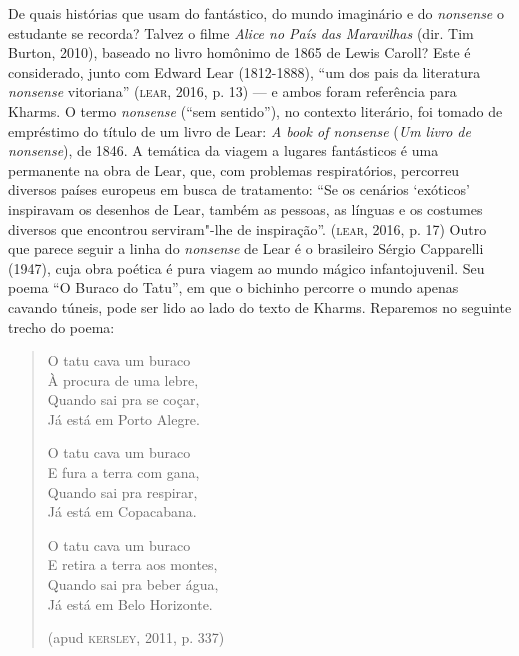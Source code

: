 \documentclass[11pt]{extarticle}
\begin{document}
De quais histórias que usam do fantástico, do mundo imaginário e do
\emph{nonsense} o estudante se recorda? Talvez o filme \emph{Alice no
País das Maravilhas} (dir. Tim Burton, 2010), baseado no livro homônimo
de 1865 de Lewis Caroll? Este é considerado, junto com Edward Lear
(1812-1888), ``um dos pais da literatura \emph{nonsense} vitoriana''
(\textsc{lear}, 2016, p. 13) --- e ambos foram referência para Kharms. O termo
\emph{nonsense} (``sem sentido''), no contexto literário, foi tomado de
empréstimo do título de um livro de Lear: \emph{A book of nonsense}
(\emph{Um livro de nonsense}), de 1846. A temática da viagem a lugares
fantásticos é uma permanente na obra de Lear, que, com problemas
respiratórios, percorreu diversos países europeus em busca de
tratamento: ``Se os cenários `exóticos' inspiravam os desenhos de Lear,
também as pessoas, as línguas e os costumes diversos que encontrou
serviram"-lhe de inspiração''. (\textsc{lear}, 2016, p. 17) Outro que parece
seguir a linha do \emph{nonsense} de Lear é o brasileiro Sérgio
Capparelli (1947), cuja obra poética é pura viagem ao mundo mágico
infantojuvenil. Seu poema ``O Buraco do Tatu'', em que o bichinho
percorre o mundo apenas cavando túneis, pode ser lido ao lado do texto
de Kharms. Reparemos no seguinte trecho do poema:

\begin{verse}
O tatu cava um buraco\\
À procura de uma lebre,\\
Quando sai pra se coçar,\\
Já está em Porto Alegre.

O tatu cava um buraco\\
E fura a terra com gana,\\
Quando sai pra respirar,\\
Já está em Copacabana.

O tatu cava um buraco\\
E retira a terra aos montes,\\
Quando sai pra beber água,\\
Já está em Belo Horizonte.

(apud \textsc{kersley}, 2011, p. 337)

\end{verse}

\begin{figure}[ht!]
\end{figure}
\end{document}
